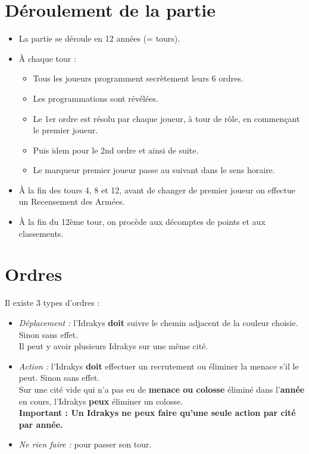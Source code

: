 \documentclass[10pt, a4paper]{article}	%
\begin{document}
\begin{multicols}{3}
\section{Déroulement de la partie} %
\label{sec:deroulement_de_la_partie}
\begin{itemize}
    \item La partie se déroule en 12 années (= tours).
    \item À chaque tour :
    \begin{itemize}
        \item Tous les joueurs programment secrètement leurs 6 ordres.
        \item Les programmations sont révélées.
        \item Le 1er ordre est résolu par chaque joueur, à tour de rôle, en commençant le premier joueur.
        \item Puis idem pour le 2nd ordre et ainsi de suite.
        \item Le marqueur premier joueur passe au suivant dans le sens horaire.
    \end{itemize}
    \item À la fin des tours 4, 8 et 12, avant de changer de premier joueur on effectue un Recensement des Armées.
    \item À la fin du 12ème tour, on procède aux décomptes de points et aux classements.
\end{itemize}


\section{Ordres} %
\label{sec:ordres}
Il existe 3 types d'ordres :
\begin{itemize}
    \item \emph{Déplacement :} l'Idrakys \textbf{doit} suivre le chemin adjacent de la couleur choisie. Sinon sans effet.\\
    Il peut y avoir plusieurs Idrakys sur une même cité.
    \item \emph{Action :} l'Idrakys \textbf{doit} effectuer un recrutement ou éliminer la menace s'il le peut. Sinon sans effet.\\
    Sur une cité vide qui n'a pas eu de \textbf{menace ou colosse} éliminé dans l'\textbf{année} en cours, l'Idrakys \textbf{peux} éliminer un colosse.\\
    \textbf{Important : Un Idrakys ne peux faire qu'une seule action par cité par année.}
    \item \emph{Ne rien faire :} pour passer son tour.
\end{itemize}


\end{multicols}
\end{document}
